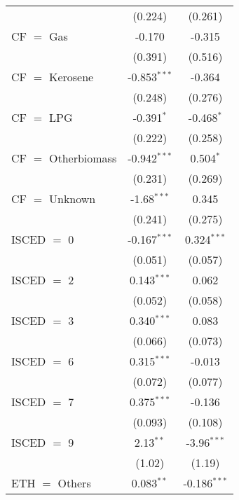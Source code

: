 \begin{table}[htbp!]
\begin{adjustbox}{width = 1\textwidth, max height = 0.95\textheight, center}
\begin{threeparttable}[b]
\begin{tabular}{lcc}
                                    & (0.224)        & (0.261)\\   
            CF $=$ Gas              & -0.170         & -0.315\\   
                                    & (0.391)        & (0.516)\\   
            CF $=$ Kerosene         & -0.853$^{***}$ & -0.364\\   
                                    & (0.248)        & (0.276)\\   
            CF $=$ LPG              & -0.391$^{*}$   & -0.468$^{*}$\\   
                                    & (0.222)        & (0.258)\\   
            CF $=$ Otherbiomass     & -0.942$^{***}$ & 0.504$^{*}$\\   
                                    & (0.231)        & (0.269)\\   
            CF $=$ Unknown          & -1.68$^{***}$  & 0.345\\   
                                    & (0.241)        & (0.275)\\   
            ISCED $=$ 0             & -0.167$^{***}$ & 0.324$^{***}$\\   
                                    & (0.051)        & (0.057)\\   
            ISCED $=$ 2             & 0.143$^{***}$  & 0.062\\   
                                    & (0.052)        & (0.058)\\   
            ISCED $=$ 3             & 0.340$^{***}$  & 0.083\\   
                                    & (0.066)        & (0.073)\\   
            ISCED $=$ 6             & 0.315$^{***}$  & -0.013\\   
                                    & (0.072)        & (0.077)\\   
            ISCED $=$ 7             & 0.375$^{***}$  & -0.136\\   
                                    & (0.093)        & (0.108)\\   
            ISCED $=$ 9             & 2.13$^{**}$    & -3.96$^{***}$\\   
                                    & (1.02)         & (1.19)\\   
            ETH $=$ Others          & 0.083$^{**}$   & -0.186$^{***}$\\   

\end{tabular}
\end{threeparttable}
\end{adjustbox}
\end{table}
